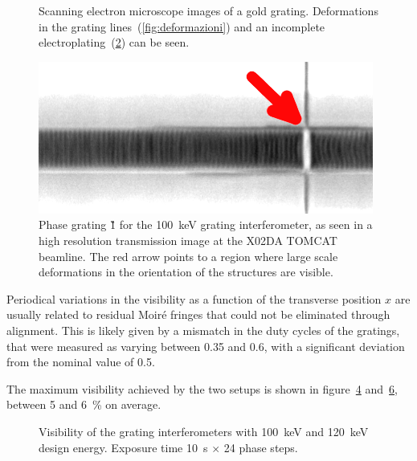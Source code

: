 \begin{figure}[htb]
\begin{subfigure}[b]{.49\textwidth}
    \caption{}
    \label{fig:galvanizzazione}
    \end{subfigure}
    \caption[Electron microscope images of a gold grating.]{Scanning
        electron microscope images of a gold grating.
        Deformations in the grating lines~(\ref{fig:deformazioni}) and an
        incomplete electroplating~(\ref{fig:galvanizzazione}) can be seen.
    }
\end{figure}

\begin{figure}[htb]
    \centering
    \includegraphics[width=\textwidth]{gfx/mythen-edge-on/tomcat-grating.png}
    \caption{Phase grating \G1 for the \SI{100}{\kilo\eV} grating
interferometer, as seen in a high resolution transmission image at the X02DA
TOMCAT beamline. The red arrow points to a region where large scale
deformations in the orientation of the structures are visible.}
    \label{fig:defects-tomcat}
\end{figure}

Periodical variations in the visibility as a function of the transverse
position $x$ are usually related to residual Moir\'e fringes that could not
be eliminated through alignment. This is likely given by a mismatch in the
duty cycles of the gratings, that were measured as varying between 
\num{0.35} and \num{0.6}, with a significant deviation from the nominal value
of \num{0.5}.

The maximum visibility achieved by the two setups is shown in 
figure~\ref{fig:visibility100} and~\ref{fig:visibility120}, between \num{5} and
\SI{6}{\percent} on average.

\begin{figure}[h!]
    \centering
    \begin{subfigure}[b]{.49\textwidth}
        \resizebox{\textwidth}{!}{}
        \caption{}
        \label{fig:visibility100}
    \end{subfigure}
    \begin{subfigure}[b]{.49\textwidth}
        \resizebox{\textwidth}{!}{}
        \caption{}
        \label{fig:visibility120}
    \end{subfigure}
    \caption{Visibility of the grating
        interferometers with
        \SI{100}{\kilo\eV} and \SI{120}{\kilo\eV} design energy. Exposure time \SI{10}{\second}
        $\times$ \num{24} phase steps.}
\end{figure}

